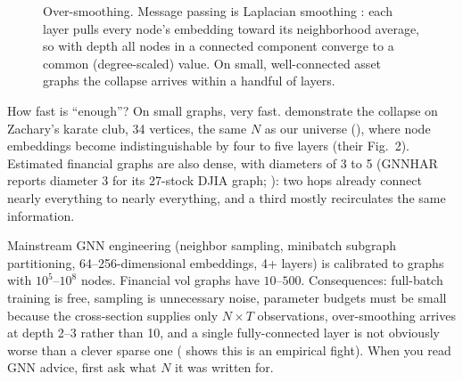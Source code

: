 \begin{figure}[ht]
\centering
{}
\caption{Over-smoothing. Message passing is Laplacian smoothing \citep{LiHanWu2018}: each layer pulls every node's embedding toward its neighborhood average, so with depth all nodes in a connected component converge to a common (degree-scaled) value. On small, well-connected asset graphs the collapse arrives within a handful of layers.}
\label{fig:gnn:oversmoothing}
\end{figure}

How fast is ``enough''? On small graphs, very fast. \citet{LiHanWu2018} demonstrate the collapse on Zachary's karate club, 34 vertices, the same $N$ as our universe (), where node embeddings become indistinguishable by four to five layers (their Fig.~2). Estimated financial graphs are also dense, with diameters of 3 to 5 (GNNHAR reports diameter 3 for its 27-stock DJIA graph; ): two hops already connect nearly everything to nearly everything, and a third mostly recirculates the same information.

\begin{keyidea}
Mainstream GNN engineering (neighbor sampling, minibatch subgraph partitioning, 64--256-dimensional embeddings, 4+ layers) is calibrated to graphs with $10^5$--$10^8$ nodes. Financial vol graphs have $10$--$500$. Consequences: full-batch training is free, sampling is unnecessary noise, parameter budgets must be small because the cross-section supplies only $N \times T$ observations, over-smoothing arrives at depth 2--3 rather than 10, and a single fully-connected layer is not obviously worse than a clever sparse one ( shows this is an empirical fight). When you read GNN advice, first ask what $N$ it was written for.
\end{keyidea}

